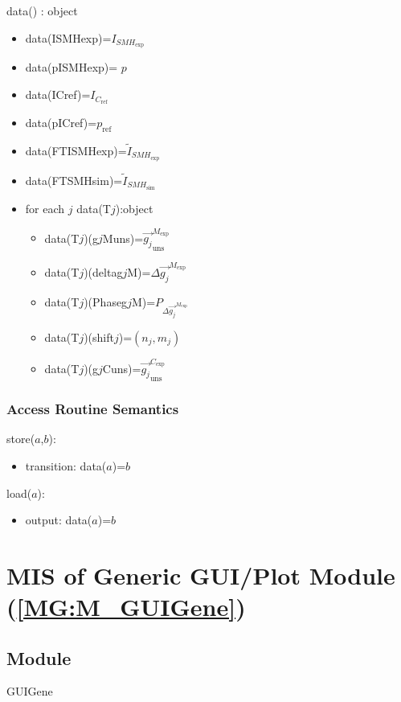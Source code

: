 \documentclass[12pt, titlepage]{article}
\begin{document}
data() : object
\begin{itemize}
\item data(ISMHexp)=$I_{\mathit{SMH}_{\text{exp}}}$
\item data(pISMHexp)= $p$
\item data(ICref)=$I_{\mathit{C}_{\text{ref}}}$
\item data(pICref)=$p_{\text{ref}}$
\item data(FTISMHexp)=$\widetilde{I}_{\mathit{SMH}_{\text{exp}}}$
\item data(FTSMHsim)=$\widetilde{I}_{\mathit{SMH}_{\text{sim}}}$
\item for each $j$ data(T$j$):object 
	\begin{itemize}
	\item data(T$j$)(g$j$Muns)=$\overrightarrow{g_{j}}_{\text{uns}}^{M_{\text{exp}}}$
	\item data(T$j$)(deltag$j$M)=$\Delta \overrightarrow{g_{j}}^{M_{\text{exp}}}$
	\item data(T$j$)(Phaseg$j$M)=$P_{\Delta \overrightarrow{g_{j}}^{M_{\text{exp}}}}$
	\item data(T$j$)(shift$j$)=$(n_j,m_j)$
	\item data(T$j$)(g$j$Cuns)=$\overrightarrow{g_{j}}_{\text{uns}}^{C_{\text{exp}}}$
	\end{itemize}

\end{itemize}

\subsubsection{Access Routine Semantics}

\noindent store($a$,$b$):
\begin{itemize}
\item transition: data($a$)=$b$
\end{itemize}

\noindent load($a$):
\begin{itemize}
\item output: data($a$)=$b$
\end{itemize}

\section{MIS of Generic GUI/Plot Module (\texorpdfstring{\cref{MG:M_GUIGene}}))} \label{MIS_GUIGene}

\subsection{Module}
GUIGene
\end{document}
